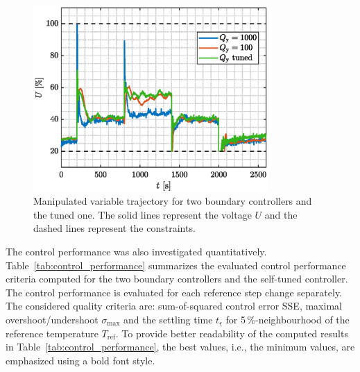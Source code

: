 \documentclass[preprint,12pt]{elsarticle}
\begin{document}
\begin{figure}
	\begin{center}
		\includegraphics[width=0.8\textwidth]{images/MV}
		\caption{Manipulated variable trajectory for two boundary controllers and the tuned one. The solid lines represent the voltage $U$ and the dashed lines represent the constraints.}
		\label{fig:MV}
	\end{center}
\end{figure}

The control performance was also investigated quantitatively. Table~\ref{tab:control_performance} summarizes the evaluated control performance criteria computed for the two boundary controllers and the self-tuned controller. The control performance is evaluated for each reference step change separately. The considered quality criteria are: sum-of-squared control error SSE, maximal overshoot/undershoot $\sigma_{\mathrm{max}}$ and the settling time $t_{\epsilon}$ for 5\,\%-neighbourhood of the reference temperature $T_{\mathrm{ref}}$. To provide better readability of the computed results in Table~\ref{tab:control_performance}, the best values, i.e., the minimum values, are emphasized using a bold font style. 
\end{document}

